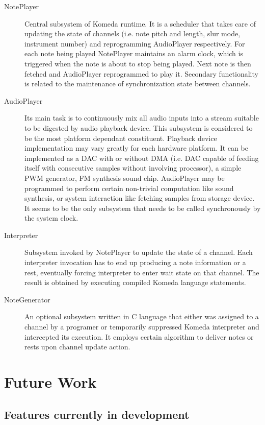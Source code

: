 \documentclass{article}
\begin{document}
\begin{description}
  \item[NotePlayer] Central subsystem of Komeda runtime. It is a scheduler that
    takes care of updating the state of channels (i.e. note pitch and length,
    slur mode, instrument number) and reprogramming AudioPlayer respectively.
    For each note being played NotePlayer maintains an alarm clock, which is
    triggered when the note is about to stop being played. Next note is then
    fetched and AudioPlayer reprogrammed to play it. Secondary functionality is
    related to the maintenance of synchronization state between channels.

  \item[AudioPlayer] Its main task is to continuously mix all audio inputs into
    a stream suitable to be digested by audio playback device. This subsystem
    is considered to be the most platform dependant constituent. Playback
    device implementation may vary greatly for each hardware platform. It can
    be implemented as a DAC with or without DMA (i.e. DAC capable of feeding
    itself with consecutive samples without involving processor), a simple PWM
    generator, FM synthesis sound chip. AudioPlayer may be programmed to
    perform certain non-trivial computation like sound synthesis, or system
    interaction like fetching samples from storage device. It seems to be the
    only subsystem that needs to be called synchronously by the system clock.

  \item[Interpreter] Subsystem invoked by NotePlayer to update the state of a
    channel. Each interpreter invocation has to end up producing a note
    information or a rest, eventually forcing interpreter to enter wait state
    on that channel. The result is obtained by executing compiled Komeda
    language statements.

  \item[NoteGenerator] An optional subsystem written in C language that either
    was assigned to a channel by a programer or temporarily suppressed Komeda
    interpreter and intercepted its execution. It employs certain algorithm to
    deliver notes or rests upon channel update action.
\end{description}

\section{Future Work}

\subsection{Features currently in development}
\end{document}
